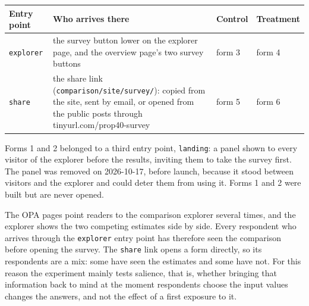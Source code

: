 {\def\LTcaptype{none} %
\begin{longtable}[]{@{}
  >{\raggedright\arraybackslash}p{}
  >{\raggedright\arraybackslash}p{}
  >{\raggedright\arraybackslash}p{}
  >{\raggedright\arraybackslash}p{}@{}}
\toprule\noalign{}
\begin{minipage}[b]{\linewidth}\raggedright
Entry point
\end{minipage} & \begin{minipage}[b]{\linewidth}\raggedright
Who arrives there
\end{minipage} & \begin{minipage}[b]{\linewidth}\raggedright
Control
\end{minipage} & \begin{minipage}[b]{\linewidth}\raggedright
Treatment
\end{minipage} \\
\midrule\noalign{}
\endhead
\bottomrule\noalign{}
\endlastfoot
\texttt{explorer} & the survey button lower on the explorer page, and the overview page's two survey buttons & form 3 & form 4 \\
\texttt{share} & the share link (\texttt{comparison/site/survey/}): copied from the site, sent by email, or opened from the public posts through tinyurl.com/prop40-survey & form 5 & form 6 \\
\end{longtable}
}

Forms 1 and 2 belonged to a third entry point, \texttt{landing}: a panel shown to every visitor of the
explorer before the results, inviting them to take the survey first. The panel was removed on
2026-10-17, before launch, because it stood between visitors and the explorer and could deter
them from using it. Forms 1 and 2 were built but are never opened.

The OPA pages point readers to the comparison explorer several times, and the explorer shows the
two competing estimates side by side. Every respondent who arrives through the \texttt{explorer} entry
point has therefore seen the comparison before opening the survey. The \texttt{share} link opens a form
directly, so its respondents are a mix: some have seen the estimates and some have not. For this
reason the experiment mainly tests salience, that is, whether bringing that information back to
mind at the moment respondents choose the input values changes the answers, and not the effect of
a first exposure to it.


